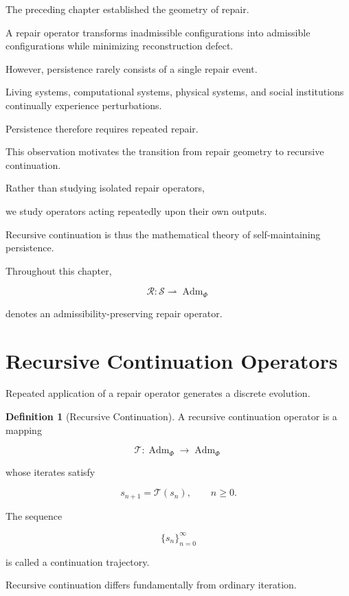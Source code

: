 \documentclass[11pt]{book}
\numberwithin{equation}{chapter}
\theoremstyle{definition}
\newtheorem{definition}{Definition}[chapter]
\theoremstyle{plain}
\begin{document}
The preceding chapter established the geometry of repair.

A repair operator transforms inadmissible configurations into
admissible configurations while minimizing reconstruction defect.

However, persistence rarely consists of a single repair event.

Living systems, computational systems, physical systems, and social
institutions continually experience perturbations.

Persistence therefore requires repeated repair.

This observation motivates the transition from repair geometry to
recursive continuation.

Rather than studying isolated repair operators,

we study operators acting repeatedly upon their own outputs.

Recursive continuation is thus the mathematical theory of
self-maintaining persistence.

Throughout this chapter,

\[
\mathcal R
:
\mathcal S
\rightharpoonup
\operatorname{Adm}_{\Phi}
\]

denotes an admissibility-preserving repair operator.

\section{Recursive Continuation Operators}

Repeated application of a repair operator generates a discrete
evolution.

\begin{definition}[Recursive Continuation]

A recursive continuation operator is a mapping

\[
\mathcal T
:
\operatorname{Adm}_{\Phi}
\rightarrow
\operatorname{Adm}_{\Phi}
\]

whose iterates satisfy

\[
s_{n+1}
=
\mathcal T(s_n),
\qquad
n\ge0.
\]

The sequence

\[
\{s_n\}_{n=0}^{\infty}
\]

is called a continuation trajectory.

\end{definition}

Recursive continuation differs fundamentally from ordinary iteration.
\end{document}
